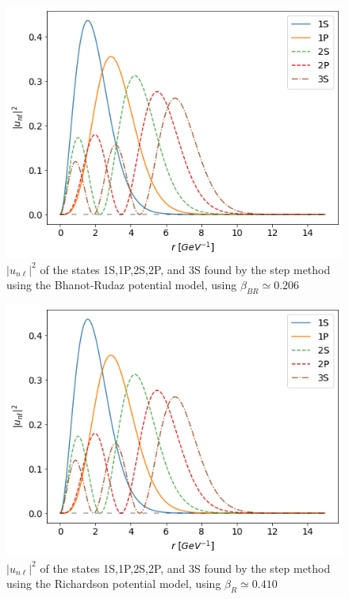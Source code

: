 \documentclass[10pt,twocolumn]{revtex4}    %
\begin{document}
\begin{figure}[!t]
    \centering
    \includegraphics[width=\linewidth]{BhRuSpectraLong.png}
    \caption{$|u_{n\ell}|^2$ of the states 1S,1P,2S,2P, and 3S found by the step method using the Bhanot-Rudaz potential model, using $\beta_{BR} \simeq 0.206$}
    \label{fig:BhRuSpectra}
\end{figure}

\begin{figure}[!h]
    \centering
    \includegraphics[width=\linewidth]{RichSpectraLong.png}
    \caption{$|u_{n\ell}|^2$ of the states 1S,1P,2S,2P, and 3S found by the step method using the Richardson potential model, using $\beta_R \simeq 0.410$}
    \label{fig:RichSpectra}
\end{figure}
\end{document}
